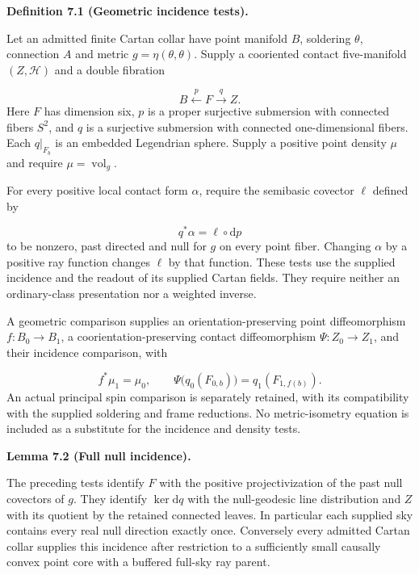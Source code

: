 \documentclass[
  english,
  11pt,
  reqno]{amsart}
\makeatletter
\newcommand{\pandocstatementheading}[1]{%
  \par\addpenalty{\@beginparpenalty}%
  \addvspace{.5\baselineskip plus .2\baselineskip minus .2\baselineskip}%
  {\normalfont\bfseries #1\par}%
  \nobreak\@afterindenttrue\@afterheading
}
\makeatother
\begin{document}
\pandocstatementheading{\leavevmode{}\label{def:online-complete-geometric-incidence}Definition 7.1 (Geometric incidence tests).}

Let an admitted finite Cartan collar have point manifold \(B\),
soldering \(\theta\), connection \(A\) and metric
\(g=\eta(\theta,\theta)\). Supply a cooriented contact five-manifold
\((Z,\mathcal H)\) and a double fibration

\label{eq:online-geometric-double-fibration} \[
B\xleftarrow{\ p\ }F\xrightarrow{\ q\ }Z.
\] Here \(F\) has dimension six, \(p\) is a proper surjective submersion
with connected fibers \(S^2\), and \(q\) is a surjective submersion with
connected one-dimensional fibers. Each \(q|_{F_b}\) is an embedded
Legendrian sphere. Supply a positive point density \(\mu\) and require
\(\mu=\operatorname{vol}_g\).

For every positive local contact form \(\alpha\), require the semibasic
covector \(\ell\) defined by

\label{eq:online-incidence-normal-covector} \[
q^*\alpha=\ell\circ\mathrm dp
\] to be nonzero, past directed and null for \(g\) on every point fiber.
Changing \(\alpha\) by a positive ray function changes \(\ell\) by that
function. These tests use the supplied incidence and the readout of its
supplied Cartan fields. They require neither an ordinary-class
presentation nor a weighted inverse.

A geometric comparison supplies an orientation-preserving point
diffeomorphism \(f:B_0\to B_1\), a coorientation-preserving contact
diffeomorphism \(\Psi:Z_0\to Z_1\), and their incidence comparison, with

\label{eq:online-geometric-arrow-tests} \[
f^*\mu_1=\mu_0,\qquad
\Psi\bigl(q_0(F_{0,b})\bigr)=q_1(F_{1,f(b)}).
\] An actual principal spin comparison is separately retained, with its
compatibility with the supplied soldering and frame reductions. No
metric-isometry equation is included as a substitute for the incidence
and density tests.

\pandocstatementheading{\leavevmode{}\label{lem:online-incidence-identification}Lemma 7.2 (Full null incidence).}

The preceding tests identify \(F\) with the positive projectivization of
the past null covectors of \(g\). They identify \(\ker\mathrm dq\) with
the null-geodesic line distribution and \(Z\) with its quotient by the
retained connected leaves. In particular each supplied sky contains
every real null direction exactly once. Conversely every admitted Cartan
collar supplies this incidence after restriction to a sufficiently small
causally convex point core with a buffered full-sky ray parent.
\end{document}
